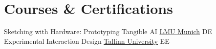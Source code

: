\section{Courses \& Certifications}
{Sketching with Hardware: Prototyping Tangible AI}
{\href{https://www.lmu.de/en/}{\color{blue}LMU Munich}}
{DE}
{}
{Experimental Interaction Design}
{\href{https://summerschool.tlu.ee/experimental-interaction-design/}{\color{blue}Tallinn University}}
{EE}
{}
